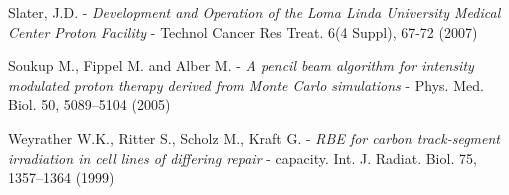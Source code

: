 \documentclass[12pt, a4paper, twoside]{book}
\begin{document}
\begin{thebibliography}{99}
Slater, J.D. -
\emph{Development and Operation of the Loma Linda University Medical Center Proton Facility} -
Technol Cancer Res Treat. 6(4 Suppl), 67-72 (2007)

Soukup M., Fippel M. and Alber M. -
\emph{A pencil beam algorithm for intensity modulated proton therapy derived from Monte Carlo simulations} -
Phys. Med. Biol. 50, 5089–5104 (2005)

Weyrather W.K., Ritter S., Scholz M., Kraft G. - 
\emph{RBE for carbon track-segment irradiation in cell lines of differing repair} -
capacity. Int. J. Radiat. Biol. 75, 1357–1364 (1999)




\end{thebibliography}




\end{document}
